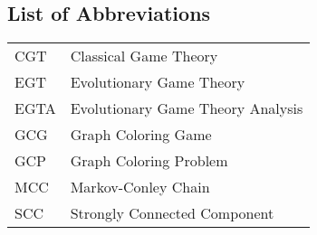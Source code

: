 \subsection*{List of Abbreviations}

\begin{longtable}[l]{ll}
    CGT  & Classical Game Theory \\
    EGT  & Evolutionary Game Theory \\
    EGTA & Evolutionary Game Theory Analysis \\
    GCG  & Graph Coloring Game \\
    GCP  & Graph Coloring Problem \\
    MCC  & Markov-Conley Chain \\
    SCC  & Strongly Connected Component \\
\end{longtable}